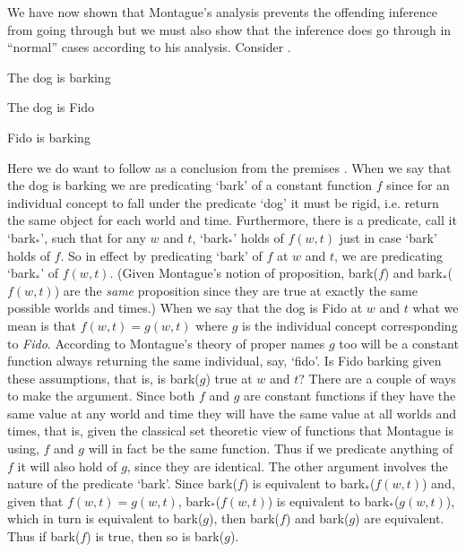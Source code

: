 We have now shown that Montague's analysis prevents the offending
inference from going through but we must also show that the inference
does go through in ``normal'' cases according to his analysis.
Consider \nexteg{}.
\begin{ex} 
\begin{subex} 
 
\item The dog is barking 
 
\item The dog is Fido

\item Fido is barking 
 
\end{subex} 
   
\end{ex} 
Here we do want  to follow as a conclusion from the premises
.  When we say that the dog is barking we are predicating
`bark' of a constant function $f$ since for an individual
concept to fall under the predicate `dog' it must be rigid,
i.e. return the same object for each world and time.  Furthermore,
there is a predicate, call it `bark$_*$', such that for any $w$ and $t$, `bark$_*$' holds of
$f(w,t)$ just in case
`bark' holds of $f$.  So in effect by predicating `bark'
of $f$ at $w$ and $t$, we are predicating `bark$_*$' of $f(w,t)$.
(Given Montague's notion of proposition, bark($f$) and
bark$_*$($f(w,t)$) are the \textit{same} proposition since they are
true at exactly the same possible worlds and times.)  When we
say that the dog is Fido at $w$ and $t$ what we mean is that
$f(w,t)=g(w,t)$ where $g$ is the individual concept corresponding to
\textit{Fido}.  According to Montague's theory of proper names $g$ too
will be a constant function always returning the same individual, say,
`fido'.  Is Fido barking given these assumptions, that is, is
bark($g$) true at $w$ and $t$?  There are a couple of ways to make the
argument.  Since both $f$ and $g$ are constant functions if they have
the same value at any world and time they will have the same value at
all worlds and times, that is, given the classical set theoretic view
of functions that Montague is using, $f$ and $g$ will in fact be the
same function.  Thus if we predicate anything of $f$ it will also hold
of $g$, since they are identical.  The other argument involves the
nature of the predicate `bark'.  Since bark($f$) is equivalent to
bark$_*$($f(w,t)$) and, given that $f(w,t)=g(w,t)$, bark$_*$($f(w,t)$)
is equivalent to bark$_*$($g(w,t)$), which in turn is equivalent to
bark($g$), then bark($f$) and bark($g$) are equivalent.  Thus if
bark($f$) is true, then so is bark($g$). 

